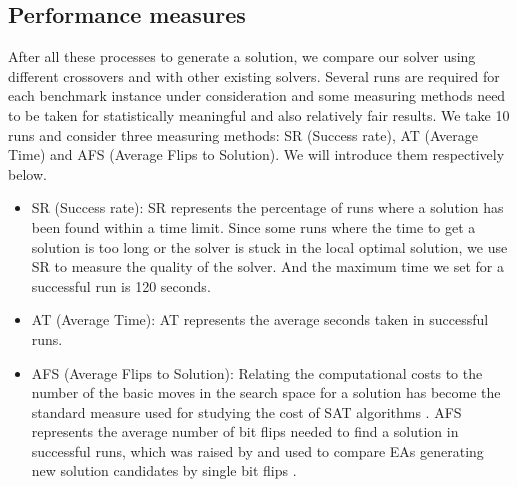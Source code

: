 	\subsection{Performance measures}
	After all these processes to generate a solution, we compare our solver using
	different crossovers and with other existing solvers. Several runs are
	required for each benchmark instance under consideration and some measuring
	methods need to be taken for statistically meaningful and also relatively fair
	results. We take 10 runs and consider three measuring methods: SR (Success
	rate), AT (Average Time) and AFS (Average Flips to Solution). We will
	introduce them respectively below.
	
	\begin{itemize}
		\item
		      SR (Success rate): SR represents the percentage of runs where a solution has
		      been found within a time limit. Since some runs where the time to get a
		      solution is too long or the solver is stuck in the local optimal solution, we
		      use SR to measure the quality of the solver. And the maximum time we set for a
		      successful run is 120 seconds.
		\item
		      AT (Average Time): AT represents the average seconds taken in successful runs.
		\item
		      AFS (Average Flips to Solution): Relating the computational costs to the
		      number of the basic moves in the search space for a solution has become the
		      standard measure used for studying the cost of SAT algorithms
		      \parencite{Singer2000}. AFS represents the average number of bit flips needed
		      to find a solution in successful runs, which was raised by
		      \citeauthor{Voss} and used to compare EAs generating new solution
		      candidates by single bit flips \parencite{Voss}.
	\end{itemize}
